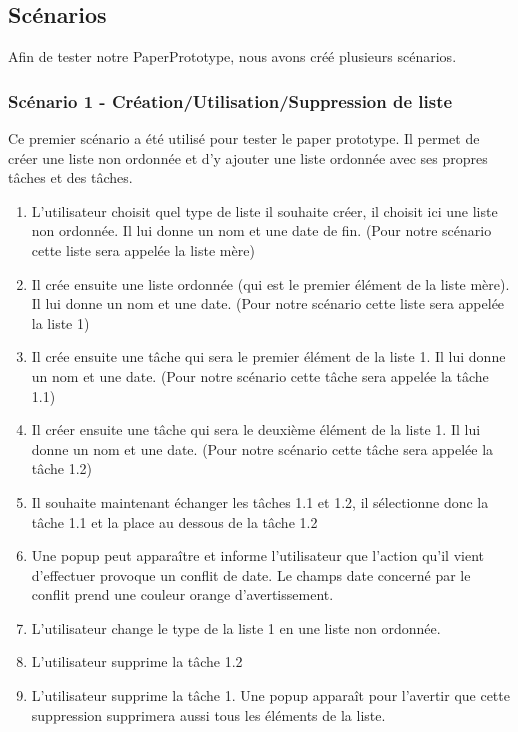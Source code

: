 \documentclass[a4paper,10pt]{article}
\begin{document}
\subsection{Scénarios}
Afin de tester notre PaperPrototype, nous avons créé plusieurs scénarios.
\subsubsection{Scénario 1 - Création/Utilisation/Suppression de liste}
Ce premier scénario a été utilisé pour tester le paper prototype. Il permet de créer une liste non ordonnée et d'y ajouter une liste ordonnée avec ses propres tâches et des tâches.
\begin{enumerate}
\item{L'utilisateur choisit quel type de liste il souhaite créer, il choisit ici une liste non ordonnée. Il lui donne un nom et une date de fin. (Pour notre scénario cette liste sera appelée la liste mère)}
\item{Il crée ensuite une liste ordonnée (qui est le premier élément de la liste mère). Il lui donne un nom et une date. (Pour notre scénario cette liste sera appelée la liste 1)}
\item{Il crée ensuite une tâche qui sera le premier élément de la liste 1. Il lui donne un nom et une date. (Pour notre scénario cette tâche sera appelée la tâche 1.1)}
\item{Il créer ensuite une tâche qui sera le deuxième élément de la liste 1. Il lui donne un nom et une date. (Pour notre scénario cette tâche sera appelée la tâche 1.2)}
\item{Il souhaite maintenant échanger les tâches 1.1 et 1.2, il sélectionne donc la tâche 1.1 et la place au dessous de la tâche 1.2}
\item{Une popup peut apparaître et informe l'utilisateur que l'action qu'il vient d'effectuer provoque un conflit de date. Le champs date concerné par le conflit prend une couleur orange d'avertissement.}
\item{L'utilisateur change le type de la liste 1 en une liste non ordonnée.}
\item{L'utilisateur supprime la tâche 1.2}
\item{L'utilisateur supprime la tâche 1. Une popup apparaît pour l'avertir que cette suppression supprimera aussi tous les éléments de la liste.}
\end{enumerate}
\end{document}
